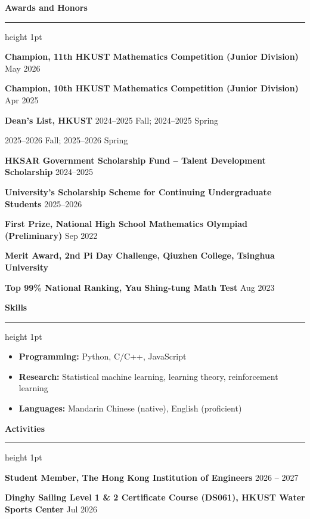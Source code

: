 \documentclass[a4paper,10pt]{article}
\newcommand{\cvsection}[1]{%
  \par\Needspace{3\baselineskip}\vspace{4pt}%
  {\color{cvblue}\textbf{\normalsize #1}}%
  \par\vspace{2pt}%
  {\color{cvblue}\hrule height 1pt}%
  \vspace{2pt}%
}
\newcommand{\cvitem}[1]{\item #1}
\begin{document}
\cvsection{Awards and Honors}
\textbf{Champion, 11th HKUST Mathematics Competition (Junior Division)}
\hfill {\color{cvblue}May 2026}\par
\textbf{Champion, 10th HKUST Mathematics Competition (Junior Division)}
\hfill {\color{cvblue}Apr 2025}\par
\textbf{Dean's List, HKUST}
\hfill {\color{cvblue}2024--2025 Fall; 2024--2025 Spring}\par
\hfill {\color{cvblue}2025--2026 Fall; 2025--2026 Spring}\par
\textbf{HKSAR Government Scholarship Fund -- Talent Development Scholarship}
\hfill {\color{cvblue}2024--2025}\par
\textbf{University's Scholarship Scheme for Continuing Undergraduate Students}
\hfill {\color{cvblue}2025--2026}\par
\textbf{First Prize, National High School Mathematics Olympiad (Preliminary)}
\hfill {\color{cvblue}Sep 2022}\par
\textbf{Merit Award, 2nd Pi Day Challenge, Qiuzhen College, Tsinghua University}\par
\textbf{Top 99\% National Ranking, Yau Shing-tung Math Test}
\hfill {\color{cvblue}Aug 2023}\par

\cvsection{Skills}
\begin{itemize}[leftmargin=1.3em, topsep=0pt, itemsep=1pt, parsep=0pt]
  \cvitem{\textbf{Programming:} Python, C/C++, JavaScript}
  \cvitem{\textbf{Research:} Statistical machine learning, learning theory, reinforcement learning}
  \cvitem{\textbf{Languages:} Mandarin Chinese (native), English (proficient)}
\end{itemize}

\cvsection{Activities}
\textbf{Student Member, The Hong Kong Institution of Engineers}
\hfill {\color{cvblue}2026 -- 2027}\par

\vspace{2pt}
\textbf{Dinghy Sailing Level 1 \& 2 Certificate Course (DS061), HKUST Water Sports Center}
\hfill {\color{cvblue}Jul 2026}\par
\end{document}
